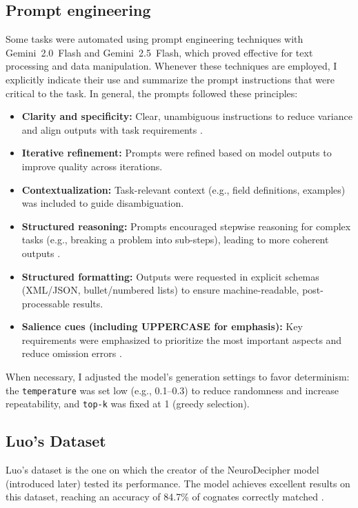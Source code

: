 \subsection{Prompt engineering}
Some tasks were automated using prompt engineering techniques with Gemini~2.0~Flash and Gemini~2.5~Flash, which proved effective for text processing and data manipulation. Whenever these techniques are employed, I explicitly indicate their use and summarize the prompt instructions that were critical to the task.
In general, the prompts followed these principles:

\begin{itemize}
\item \textbf{Clarity and specificity:} Clear, unambiguous instructions to reduce variance and align outputs with task requirements \cite{prompting-programming}.

\item \textbf{Iterative refinement:} Prompts were refined based on model outputs to improve quality across iterations.

\item \textbf{Contextualization:} Task-relevant context (e.g., field definitions, examples) was included to guide disambiguation.

\item \textbf{Structured reasoning:} Prompts encouraged stepwise reasoning for complex tasks (e.g., breaking a problem into sub-steps), leading to more coherent outputs \cite{cot}.

\item \textbf{Structured formatting:} Outputs were requested in explicit schemas (XML/JSON, bullet/numbered lists) to ensure machine-readable, post-processable results.

\item \textbf{Salience cues (including UPPERCASE for emphasis):} Key requirements were emphasized to prioritize the most important aspects and reduce omission errors \cite{uppercase-is-all-you-need}.
\end{itemize}

When necessary, I adjusted the model's generation settings to favor determinism: the \texttt{temperature} was set low (e.g., 0.1--0.3) to reduce randomness and increase repeatability, and \texttt{top-k} was fixed at 1 (greedy selection).

\subsection{Luo's Dataset}
Luo's dataset is the one on which the creator of the NeuroDecipher model (introduced later) tested its performance.
The model achieves excellent results on this dataset, reaching an accuracy of 84.7\% of cognates correctly matched \cite{luo}.

